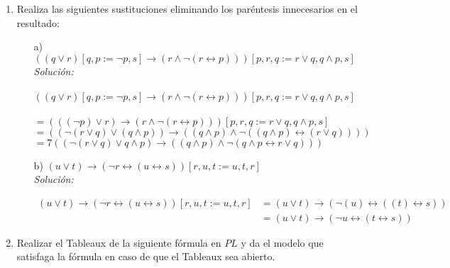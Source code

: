 \documentclass[letterpaper,10pt]{article}
\begin{document}
\begin{enumerate}
        \newpage
        \item Realiza las siguientes sustituciones eliminando los paréntesis
        innecesarios en el resultado:

        \begin{itemize}    
            \item[a)] $((q \lor r) [q, p := \neg p, s] 
            \rightarrow (r \land \neg (r \leftrightarrow p)))
            [p, r, q := r \lor q, q \land p, s]$ \\
            \textit{Solución: \\ \\}
            $((q \lor r) [q, p := \neg p, s] \rightarrow (r \land \neg (r \leftrightarrow p)))
            [p, r, q := r \lor q, q \land p, s] $ \\ \\
            $= (((\neg p) \lor r) \rightarrow (r \land \neg (r \leftrightarrow p)))
            [p, r, q := r \lor q, q \land p, s] $ \\
            $= ((\neg (r \lor q) \lor (q \land p)) \rightarrow 
            ((q \land p) \land \neg ((q \land p) \leftrightarrow (r \lor q))))$ \\
            $= 7((\neg (r \lor q) \lor q \land p) \rightarrow
            ((q \land p) \land \neg (q \land p \leftrightarrow r \lor q)))$  
            
            \item[b)] $(u \lor t) \rightarrow 
            (\neg r \leftrightarrow (u \leftrightarrow s))[r, u, t := u, t, r]$ \\
            \textit{Solución:}

            \begin{align*}
                (u \lor t) \rightarrow (\neg r \leftrightarrow (u \leftrightarrow s))
                [r, u, t := u, t, r]
                &= (u \lor t) \rightarrow (\neg (u) \leftrightarrow ((t) \leftrightarrow s)) \\
                &= (u \lor t) \rightarrow (\neg u \leftrightarrow (t \leftrightarrow s))
            \end{align*}
        \end{itemize}

        \item Realizar el Tableaux de la siguiente fórmula en $PL$ y da el
        modelo que satisfaga la fórmula en caso de que el Tableaux sea 
        abierto.


\end{enumerate}
\end{document}
